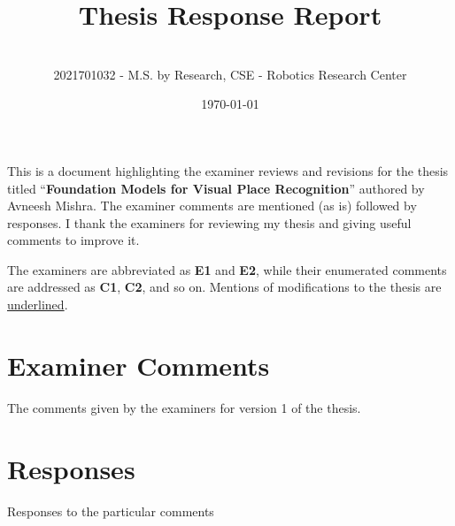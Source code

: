 \documentclass{article}
\title{
    {\LARGE Thesis Response Report} \\
    {\Large\bfseries \thesisTitle}
}
\author{{\myName} \\
    {\small 2021701032 - M.S. by Research, CSE - 
        Robotics Research Center}
}
\date{\today}
\newcommand{\thesisTitle}
        {Foundation Models for Visual Place Recognition}
\newcommand{\myName}{Avneesh Mishra}
\begin{document}
    \maketitle
    This is a document highlighting the examiner reviews and revisions
    for the thesis titled ``{\bf \thesisTitle}'' authored by \myName.
    The examiner comments are mentioned (as is) followed by responses.
    I thank the examiners for reviewing my thesis and giving useful
    comments to improve it.

    \noindent The examiners are abbreviated as \textbf{E1} and
    \textbf{E2}, while their enumerated comments are addressed as
    \textbf{C1}, \textbf{C2}, and so on. Mentions of modifications to
    the thesis are \ul{underlined}.

    \tableofcontents
    \pagebreak

    \section{Examiner Comments}
    The comments given by the examiners for version 1 of the thesis.
    

    \section{Responses}
    Responses to the particular comments
    
\end{document}
